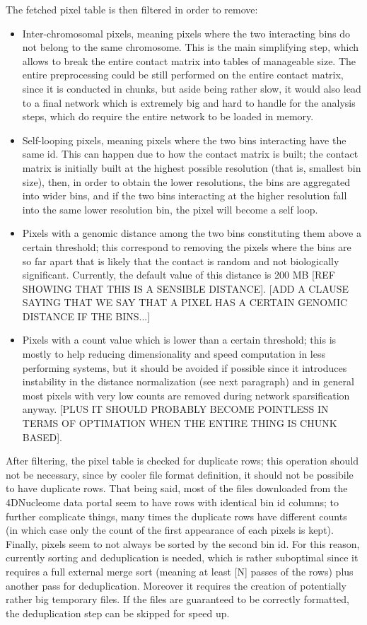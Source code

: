 The fetched pixel table is then filtered in order to remove:
\begin{itemize}\tightlist
  \item Inter-chromosomal pixels, meaning pixels where the two interacting bins do not belong to the same chromosome. This is the main simplifying step, which allows to break the entire contact matrix into tables of manageable size. The entire preprocessing could be still performed on the entire contact matrix, since it is conducted in chunks, but aside being rather slow, it would also lead to a final network which is extremely big and hard to handle for the analysis steps, which do require the entire network to be loaded in memory.
  \item Self-looping pixels, meaning pixels where the two bins interacting have the same id. This can happen due to how the contact matrix is built; the contact matrix is initially built at the highest possible resolution (that is, smallest bin size), then, in order to obtain the lower resolutions, the bins are aggregated into wider bins, and if the two bins interacting at the higher resolution fall into the same lower resolution bin, the pixel will become a self loop.
  \item Pixels with a genomic distance among the two bins constituting them above a certain threshold; this correspond to removing the pixels where the bins are so far apart that is likely that the contact is random and not biologically significant. Currently, the default value of this distance is 200 MB [REF SHOWING THAT THIS IS A SENSIBLE DISTANCE]. [ADD A CLAUSE SAYING THAT WE SAY THAT A PIXEL HAS A CERTAIN GENOMIC DISTANCE IF THE BINS...]
  \item Pixels with a count value which is lower than a certain threshold; this is mostly to help reducing dimensionality and speed computation in less performing systems, but it should be avoided if possible since it introduces instability in the distance normalization (see next paragraph) and in general most pixels with very low counts are removed during network sparsification anyway. [PLUS IT SHOULD PROBABLY BECOME POINTLESS IN TERMS OF OPTIMATION WHEN THE ENTIRE THING IS CHUNK BASED].
\end{itemize}

After filtering, the pixel table is checked for duplicate rows; this operation should not be necessary, since by cooler file format definition, it should not be possibile to have duplicate rows. That being said, most of the files downloaded from the 4DNucleome data portal seem to have rows with identical bin id columns; to further complicate things, many times the duplicate rows have different counts (in which case only the count of the first appearance of each pixels is kept). Finally, pixels seem to not always be sorted by the second bin id. For this reason, currently sorting and deduplication is needed, which is rather suboptimal since it requires a full external merge sort (meaning at least [N] passes of the rows) plus another pass for deduplication. Moreover it requires the creation of potentially rather big temporary files. If the files are guaranteed to be correctly formatted, the deduplication step can be skipped for speed up.

